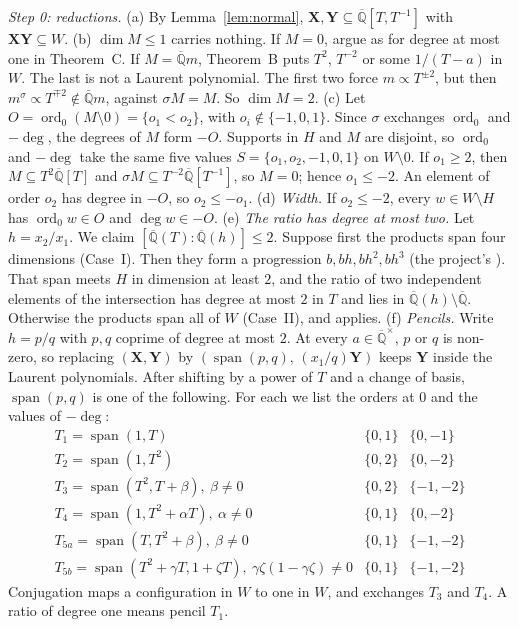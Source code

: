 \documentclass[11pt,a4paper]{article}
\theoremstyle{plain}
\theoremstyle{definition}
\newcommand{\Qbar}{\overline{\mathbb{Q}}}
\newcommand{\ord}{\operatorname{ord}}
\newcommand{\spn}{\operatorname{span}}
\begin{document}
\emph{Step 0: reductions.}
(a) By Lemma~\ref{lem:normal}, $\mathbf X,\mathbf Y\subseteq\Qbar[T,T^{-1}]$ with
$\mathbf X\mathbf Y\subseteq W$.
(b) $\dim M\le1$ carries nothing. If $M=0$, argue as for degree at most one in
Theorem~C. If $M=\Qbar m$, Theorem~B puts $T^{2}$, $T^{-2}$ or some $1/(T-a)$ in $W$. The
last is not a Laurent polynomial. The first two force $m\propto T^{\pm2}$, but then
$m^{\sigma}\propto T^{\mp2}\notin\Qbar m$, against $\sigma M=M$. So $\dim M=2$.
(c) Let $O=\ord_{0}(M\setminus0)=\{o_{1}<o_{2}\}$, with $o_{i}\notin\{-1,0,1\}$. Since $\sigma$
exchanges $\ord_{0}$ and $-\deg$, the degrees of $M$ form $-O$. Supports in $H$ and $M$ are
disjoint, so $\ord_{0}$ and $-\deg$ take the same five values $S=\{o_{1},o_{2},-1,0,1\}$ on
$W\setminus0$. If $o_{1}\ge2$, then $M\subseteq T^{2}\Qbar[T]$ and
$\sigma M\subseteq T^{-2}\Qbar[T^{-1}]$, so $M=0$; hence $o_{1}\le-2$. An element of order
$o_{2}$ has degree in $-O$, so $o_{2}\le-o_{1}$.
(d) \emph{Width.} If $o_{2}\le-2$, every $w\in W\setminus H$ has $\ord_{0}w\in O$ and
$\deg w\in-O$.
(e) \emph{The ratio has degree at most two.} Let $h=x_{2}/x_{1}$. We claim
$[\Qbar(T):\Qbar(h)]\le2$. Suppose first the products span four dimensions (Case~I).
Then they form a progression $b,bh,bh^{2},bh^{3}$ \cite[Lemma~4]{BSZ17} (the project's \cite[Lemma~10.2]{BP}). That span meets
$H$ in dimension at least $2$, and the ratio of two independent elements of the
intersection has degree at most $2$ in $T$ and lies in $\Qbar(h)\setminus\Qbar$.
Otherwise the products span all of $W$ (Case~II), and \cite[Thm.~10.58]{BP} applies.
(f) \emph{Pencils.} Write $h=p/q$ with $p,q$ coprime of degree at most $2$. At every
$a\in\Qbar^{\times}$, $p$ or $q$ is non-zero, so replacing $(\mathbf X,\mathbf Y)$ by
$(\spn(p,q),\,(x_{1}/q)\mathbf Y)$ keeps $\mathbf Y$ inside the Laurent polynomials. After
shifting by a power of $T$ and a change of basis, $\spn(p,q)$ is one of the following.
For each we list the orders at $0$ and the values of $-\deg$:
\[
\begin{array}{lll}
T_{1}=\spn(1,T) & \{0,1\} & \{0,-1\}\\
T_{2}=\spn(1,T^{2}) & \{0,2\} & \{0,-2\}\\
T_{3}=\spn(T^{2},T+\beta),\ \beta\neq0 & \{0,2\} & \{-1,-2\}\\
T_{4}=\spn(1,T^{2}+\alpha T),\ \alpha\neq0 & \{0,1\} & \{0,-2\}\\
T_{5a}=\spn(T,T^{2}+\beta),\ \beta\neq0 & \{0,1\} & \{-1,-2\}\\
T_{5b}=\spn(T^{2}+\gamma T,1+\zeta T),\ \gamma\zeta(1-\gamma\zeta)\neq0 & \{0,1\} & \{-1,-2\}
\end{array}
\]
Conjugation maps a configuration in $W$ to one in $W$, and exchanges $T_{3}$ and $T_{4}$.
A ratio of degree one means pencil $T_{1}$.
\end{document}
